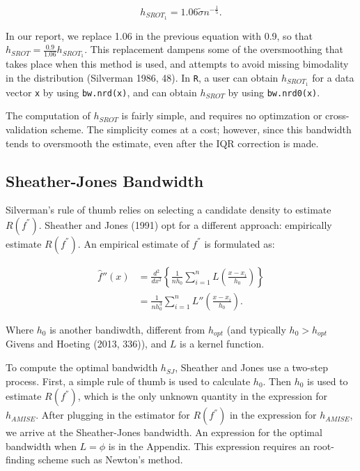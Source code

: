\documentclass[]{article}
\begin{document}
\[
h_{SROT_1} = 1.06 \tilde{\sigma} n ^ {-\frac{1}{5}}.
\]

In our report, we replace 1.06 in the previous equation with 0.9, so
that \(h_{SROT} = \frac{0.9}{1.06} h_{SROT_1}\). This replacement
dampens some of the oversmoothing that takes place when this method is
used, and attempts to avoid missing bimodality in the distribution
(Silverman 1986, 48). In \texttt{R}, a user can obtain \(h_{SROT_1}\)
for a data vector \texttt{x} by using \texttt{bw.nrd(x)}, and can obtain
\(h_{SROT}\) by using \texttt{bw.nrd0(x)}.

The computation of \(h_{SROT}\) is fairly simple, and requires no
optimzation or cross-validation scheme. The simplicity comes at a cost;
however, since this bandwidth tends to oversmooth the estimate, even
after the IQR correction is made.

\subsection{Sheather-Jones Bandwidth}\label{sheather-jones-bandwidth}

Silverman's rule of thumb relies on selecting a candidate density to
estimate \(R(f^{''})\). Sheather and Jones (1991) opt for a different
approach: empirically estimate \(R(f^{''})\). An empirical estimate of
\(f^{''}\) is formulated as:

\[
\begin{aligned}
\hat{f}''(x) &= \frac{d^2}{dx^2} \left\{\frac{1}{nh_0} \sum_{i=1}^{n} L\left(\frac{x - x_i}{h_0}  \right) \right\}\\
&= \frac{1}{nh_0^3} \sum_{i=1}^{n} L''\left(\frac{x-x_i}{h_0} \right).
\end{aligned}
\]

Where \(h_0\) is another bandiwdth, different from \(h_{opt}\) (and
typically \(h_0 > h_{opt}\) Givens and Hoeting (2013, 336)), and \(L\)
is a kernel function.

To compute the optimal bandwidth \(h_{SJ}\), Sheather and Jones use a
two-step process. First, a simple rule of thumb is used to calculate
\(h_0\). Then \(h_0\) is used to estimate \(R(f^{''})\), which is the
only unknown quantity in the expression for \(h_{AMISE}\). After
plugging in the estimator for \(R(f^{''})\) in the expression for
\(h_{AMISE}\), we arrive at the Sheather-Jones bandwidth. An expression
for the optimal bandwidth when \(L = \phi\) is in the Appendix. This
expression requires an root-finding scheme such as Newton's method.
\end{document}
